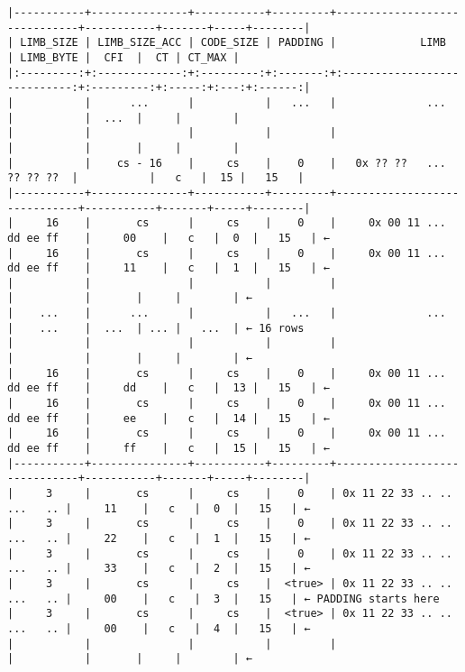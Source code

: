 \documentclass[varwidth=\maxdimen,margin=0.5cm,multi={verbatim}]{standalone}
\begin{document}
\begin{verbatim}
|-----------+---------------+-----------+---------+------------------------------+-----------+-------+-----+--------|
| LIMB_SIZE | LIMB_SIZE_ACC | CODE_SIZE | PADDING |             LIMB             | LIMB_BYTE |  CFI  |  CT | CT_MAX |
|:---------:+:-------------:+:---------:+:-------:+:----------------------------:+:---------:+:-----:+:---:+:------:|
|           |      ...      |           |   ...   |              ...             |           |  ...  |     |        |
|           |               |           |         |                              |           |       |     |        |
|           |    cs - 16    |     cs    |    0    |   0x ?? ??   ...   ?? ?? ??  |           |   c   |  15 |   15   |
|-----------+---------------+-----------+---------+------------------------------+-----------+-------+-----+--------|
|     16    |       cs      |     cs    |    0    |     0x 00 11 ... dd ee ff    |     00    |   c   |  0  |   15   | ←
|     16    |       cs      |     cs    |    0    |     0x 00 11 ... dd ee ff    |     11    |   c   |  1  |   15   | ←
|           |               |           |         |                              |           |       |     |        | ←
|    ...    |      ...      |           |   ...   |              ...             |    ...    |  ...  | ... |   ...  | ← 16 rows
|           |               |           |         |                              |           |       |     |        | ←
|     16    |       cs      |     cs    |    0    |     0x 00 11 ... dd ee ff    |     dd    |   c   |  13 |   15   | ←
|     16    |       cs      |     cs    |    0    |     0x 00 11 ... dd ee ff    |     ee    |   c   |  14 |   15   | ←
|     16    |       cs      |     cs    |    0    |     0x 00 11 ... dd ee ff    |     ff    |   c   |  15 |   15   | ←
|-----------+---------------+-----------+---------+------------------------------+-----------+-------+-----+--------|
|     3     |       cs      |     cs    |    0    | 0x 11 22 33 .. ..   ...   .. |     11    |   c   |  0  |   15   | ←
|     3     |       cs      |     cs    |    0    | 0x 11 22 33 .. ..   ...   .. |     22    |   c   |  1  |   15   | ←
|     3     |       cs      |     cs    |    0    | 0x 11 22 33 .. ..   ...   .. |     33    |   c   |  2  |   15   | ←
|     3     |       cs      |     cs    |  <true> | 0x 11 22 33 .. ..   ...   .. |     00    |   c   |  3  |   15   | ← PADDING starts here
|     3     |       cs      |     cs    |  <true> | 0x 11 22 33 .. ..   ...   .. |     00    |   c   |  4  |   15   | ←
|           |               |           |         |                              |           |       |     |        | ←

\end{verbatim}
\end{document}

